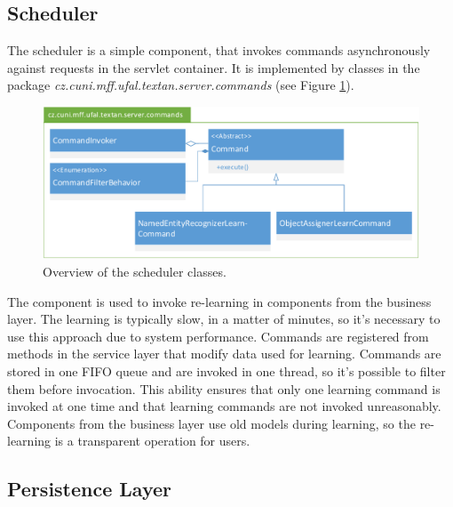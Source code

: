 \subsection{Scheduler}
The scheduler is a simple component, that invokes commands asynchronously against
requests in the servlet container. It is implemented by classes in the package
\emph{cz.\-cuni.\-mff.\-ufal.\-textan.\-server.\-commands} (see Figure
\ref{fig:CommandsOverview}).

\begin{figure}[!htb]
        \centering
        \includegraphics[width=\textwidth]{Images/Commands}
        \caption{Overview of the scheduler classes.}
        \label{fig:CommandsOverview}
\end{figure}

The component is used to invoke re-learning in components from the business layer.
The learning is typically slow, in a matter of minutes, so it's necessary to use
this approach due to system performance. Commands are registered from methods in
the service layer that modify data used for learning. Commands are stored in one
FIFO queue and are invoked in one thread, so it's possible to filter them before
invocation. This ability ensures that only one learning command is invoked at one
time and that learning commands are not invoked unreasonably. Components from
the business layer use old models during learning, so the re-learning is a transparent
operation for users.

\subsection{Persistence Layer}




